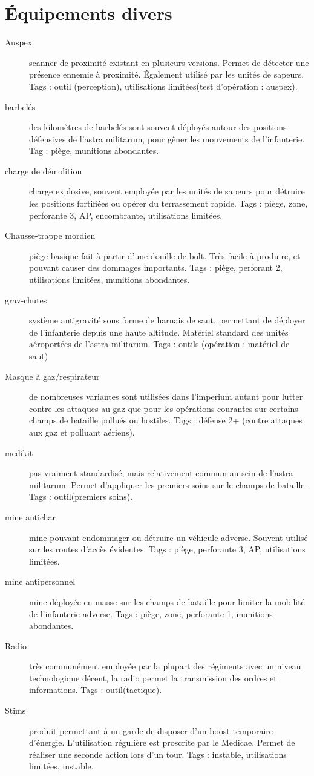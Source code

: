 \documentclass[10pt,a4paper]{article}
\begin{document}
\section{Équipements divers}
\begin{description}
\item[Auspex]scanner de proximité existant en plusieurs versions. Permet de détecter une présence ennemie à proximité. Également utilisé par les unités de sapeurs. Tags : outil (perception), utilisations limitées(test d'opération : auspex).
\item[barbelés] des kilomètres de barbelés sont souvent déployés autour des positions défensives de l'astra militarum, pour gêner les mouvements de l'infanterie. Tag : piège, munitions abondantes.
\item[charge de démolition] charge explosive, souvent employée par les unités de sapeurs pour détruire les positions fortifiées ou opérer du terrassement rapide. Tags : piège, zone, perforante 3, AP, encombrante, utilisations limitées. 
\item[Chausse-trappe mordien] piège basique fait à partir d'une douille de bolt. Très facile à produire, et pouvant causer des dommages importants. Tags : piège, perforant 2, utilisations limitées, munitions abondantes.
\item[grav-chutes]système antigravité sous forme de harnais de saut, permettant de déployer de l'infanterie depuis une haute altitude. Matériel standard des unités aéroportées de l'astra militarum. Tags : outils (opération : matériel de saut)
\item[Masque à gaz/respirateur] de nombreuses variantes sont utilisées dans l'imperium autant pour lutter contre les attaques au gaz que pour les opérations courantes sur certains champs de bataille pollués ou hostiles. Tags : défense 2+ (contre attaques aux gaz et polluant aériens).
\item[medikit] pas vraiment standardisé, mais relativement commun au sein de l'astra militarum. Permet d'appliquer les premiers soins sur le champs de bataille. Tags : outil(premiers soins).
\item[mine antichar] mine pouvant endommager ou détruire un véhicule adverse. Souvent utilisé sur les routes d'accès évidentes. Tags : piège, perforante 3, AP, utilisations limitées.
\item[mine antipersonnel] mine déployée en masse sur les champs de bataille pour limiter la mobilité de l'infanterie adverse. Tags : piège, zone, perforante 1, munitions abondantes.
\item[Radio] très communément employée par la plupart des régiments avec un niveau technologique décent, la radio permet la transmission des ordres et informations. Tags : outil(tactique).
\item[Stims] produit permettant à un garde de disposer d'un boost temporaire d'énergie. L'utilisation régulière est proscrite par le Medicae. Permet de réaliser une seconde action lors d'un tour. Tags : instable, utilisations limitées, instable.

\end{description}
\end{document}
